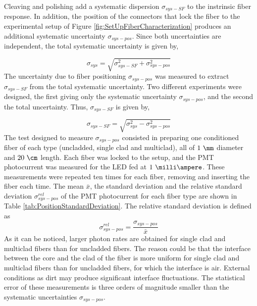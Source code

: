 Cleaving and polishing add a systematic dispersion $\sigma_{sys-SF}$ to the instrinsic fiber response. In addition, the position of the connectors that lock the fiber to the experimental setup of Figure \ref{fig:SetUpFiberCharacterization} produces an additional systematic uncertainty $\sigma_{sys-pos}$. Since both uncertainties are independent, the total systematic uncertainty is given by,

\begin{equation}
\sigma_{sys} = \sqrt{\sigma^2_{sys-SF} + \sigma^2_{sys-pos} }
\label{eq:TotalUncertaintyFiberCharacterization}
\end{equation}
The uncertainty due to fiber positioning $\sigma_{sys-pos}$ was measured to extract $\sigma_{sys-SF}$ from the total systematic uncertainty. Two different experiments were designed, the first giving only the systematic uncertainty $\sigma_{sys-pos}$, and the second the total uncertainty. Thus, $\sigma_{sys-SF}$ is given by,

\begin{equation}
\sigma_{sys-SF} = \sqrt{\sigma^2_{sys} - \sigma^2_{sys-pos} }
\label{eq:TMUncertaintyFiberCharacterization}
\end{equation}
The test designed to measure $\sigma_{sys-pos}$ consisted in preparing one conditioned fiber of each type (uncladded, single clad and multiclad), all of $1~\mm$ diameter and $20~\cm$ length. Each fiber was locked to the setup, and the PMT photocurrent was measured for the LED fed at $1~\milli\ampere$. These measurements were repeated ten times for each fiber, removing and inserting the fiber each time. The mean $\bar{x}$, the standard deviation  and the relative standard deviation $\sigma^{rel}_{sys-pos}$
of the PMT photocurrent for each fiber type are shown in Table \ref{tab:PositionStandardDeviation}. The relative standard deviation is defined as
\begin{equation}
\sigma^{rel}_{sys-pos} = \frac{\sigma_{sys-pos}}{\bar{x}}
\label{eq:RelativeStandardDesviation}
\end{equation}
As it can be noticed, larger photon rates are obtained for single clad and multiclad fibers than for uncladded fibers. The reason could be that the interface between the core and the clad of the fiber is more uniform for single clad and multiclad fibers than for uncladded fibers, for which the interface is air. External conditions as dirt may produce significant interface fluctuations. The statistical error of these measurements is three orders of magnitude smaller than the systematic uncertainties $\sigma_{sys-pos}$.

